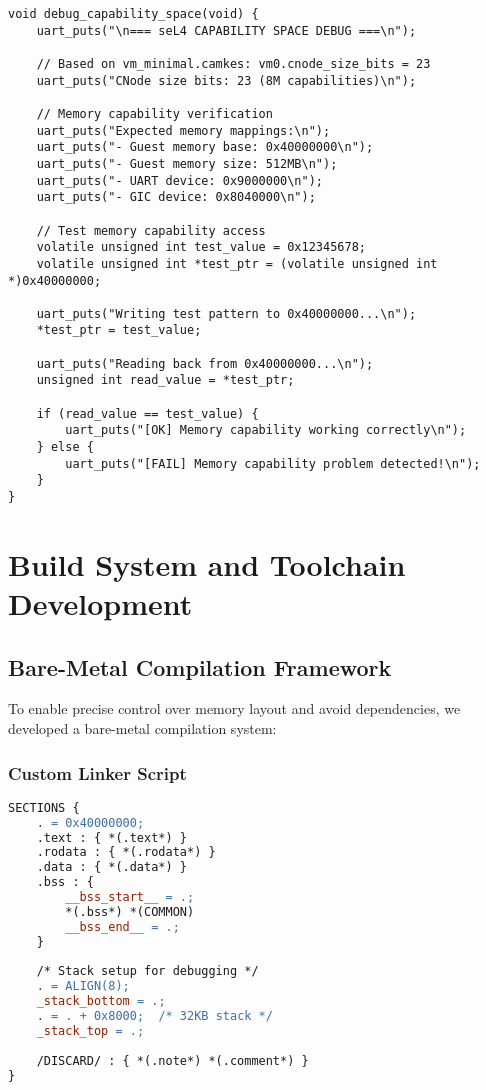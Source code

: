 \documentclass[11pt,a4paper]{article}
\begin{document}
\begin{lstlisting}[caption={Capability Space Debugging Implementation}]
void debug_capability_space(void) {
    uart_puts("\n=== seL4 CAPABILITY SPACE DEBUG ===\n");
    
    // Based on vm_minimal.camkes: vm0.cnode_size_bits = 23
    uart_puts("CNode size bits: 23 (8M capabilities)\n");
    
    // Memory capability verification
    uart_puts("Expected memory mappings:\n");
    uart_puts("- Guest memory base: 0x40000000\n");
    uart_puts("- Guest memory size: 512MB\n");
    uart_puts("- UART device: 0x9000000\n");
    uart_puts("- GIC device: 0x8040000\n");
    
    // Test memory capability access
    volatile unsigned int test_value = 0x12345678;
    volatile unsigned int *test_ptr = (volatile unsigned int *)0x40000000;
    
    uart_puts("Writing test pattern to 0x40000000...\n");
    *test_ptr = test_value;
    
    uart_puts("Reading back from 0x40000000...\n");
    unsigned int read_value = *test_ptr;
    
    if (read_value == test_value) {
        uart_puts("[OK] Memory capability working correctly\n");
    } else {
        uart_puts("[FAIL] Memory capability problem detected!\n");
    }
}
\end{lstlisting}

\section{Build System and Toolchain Development}

\subsection{Bare-Metal Compilation Framework}

To enable precise control over memory layout and avoid dependencies, we developed a bare-metal compilation system:

\subsubsection{Custom Linker Script}

\begin{lstlisting}[language=make,caption={Enhanced Linker Script for Memory Debugging}]
SECTIONS {
    . = 0x40000000;
    .text : { *(.text*) }
    .rodata : { *(.rodata*) }
    .data : { *(.data*) }
    .bss : { 
        __bss_start__ = .;
        *(.bss*) *(COMMON) 
        __bss_end__ = .;
    }
    
    /* Stack setup for debugging */
    . = ALIGN(8);
    _stack_bottom = .;
    . = . + 0x8000;  /* 32KB stack */
    _stack_top = .;
    
    /DISCARD/ : { *(.note*) *(.comment*) }
}
\end{lstlisting}
\end{document}
